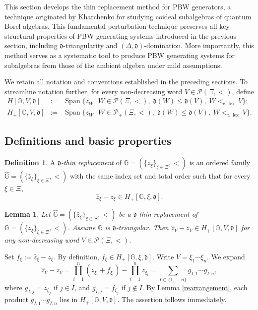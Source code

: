 \documentclass{article}
\makeatletter
\renewenvironment{proof}[1][\proofname]{\par
	\pushQED{\qed}%
	\normalfont \topsep6\p@\@plus6\p@\relax
	\trivlist
	\item[\hskip\labelsep
	\bfseries
	#1\@addpunct{.}]\ignorespaces
}{%
	\popQED\endtrivlist\@endpefalse
}
\theoremstyle{plain}
\newtheorem{lemma}[thm]{Lemma}
\theoremstyle{definition}
\newtheorem{definition}[thm]{Definition}
\numberwithin{equation}{section}
\DeclareMathOperator{\Span}{Span}
\DeclareMathOperator{\lex}{lex}
\newcommand{\GG}{\mathbb{G}}
\newcommand{\dd}{\mathfrak{d}}
\newcommand{\rr}{\mathfrak{r}}
\makeatother
\begin{document}
	This section develops the thin replacement method for PBW generators, a technique originated by Kharchenko \cite{Kh08} for studying coideal subalgebras of quantum  Borel algebras. This fundamental perturbation technique preserves all key structural properties of PBW generating systems introduced in the previous section, including $\dd$-triangularity and $(\Delta,\dd)$-domination. More importantly, this method serves as a  systematic tool to produce PBW generating systems for subalgebras from those of the  ambient algebra under mild assumptions. 
	
	We retain all notation and conventions established in the preceding sections. To streamline notation further, for every non-decreasing word $V\in \mathcal{P}(\Xi, <)$, define
	\begin{eqnarray*}
		H[\GG, V,\dd] &:=& \Span\big\{z_{W} \,\big|\, W \in \mathcal{P}(\Xi, <),\; \dd(W) \leq \dd(V),\; W<_{\rr,\lex} V \big\}; \\
		H_{+}[\GG, V,\dd] &:=& \Span\big\{z_{W} \,\big|\, W \in \mathcal{P}_{+}(\Xi, <),\; \dd(W) \leq \dd(V),\; W<_{\rr,\lex} V \big\}.
	\end{eqnarray*}
	
	\subsection{Definitions and basic properties}
	
	\begin{definition}\label{thin replacement}
		A \emph{$\dd$-thin replacement}
		of $\GG=(\{z_{\xi}\}_{\xi\in \Xi}, <)$ is an ordered family
		$\hat{\GG}=(\{\hat{z}_{\xi}\}_{\xi\in \Xi}, <)$ with the same index set and total order such that for every $\xi\in\Xi$,
		\[
		\hat{z}_{\xi}-z_{\xi}\in  H_{+}[\GG,\xi,\dd].
		\]
	\end{definition}
	
	\begin{lemma}\label{replacement-control}
		Let $\hat{\GG}=(\{\hat{z}_{\xi}\}_{\xi\in \Xi}, <)$ be a $\dd$-thin replacement of $\GG=(\{z_{\xi}\}_{\xi\in \Xi}, <)$. Assume $\GG$ is $\dd$-triangular. Then $\hat{z}_V -z_{V} \in H_{+}[\GG,V,\dd]$ for any non-decreasing word $V\in \mathcal{P}(\Xi,<)$.
	\end{lemma}
	
	\begin{proof}
		Set $f_{\xi} := \hat{z}_\xi - z_\xi$. By definition, $f_{\xi} \in  H_{+}[\GG,\xi,\dd]$. Write $V=\xi_1\cdots\xi_n$. We expand
		\[
		\hat{z}_V -z_{V} = \prod_{i=1}^{n}(z_{\xi_i}+f_{\xi_i})-\prod_{i=1}^{n}z_{\xi_{i}} = \sum_{I\subset \{1,\ldots, n\}} g_{I,1}\cdots g_{I,n},
		\]
		where $g_{I,j} =z_{\xi_{j}}$ if $j\in I$, and $g_{I,j} =f_{\xi_{j}}$ if $j\not\in I$. By Lemma \ref{rearrangement}, each product $g_{I,1}\cdots g_{I,n}$ lies in $H_{+}[\GG,V,\dd]$. The assertion follows immediately.
	\end{proof}
	
\end{document}
